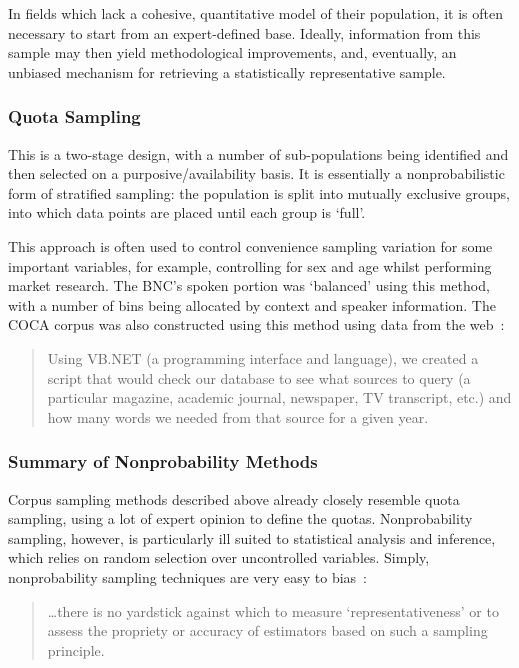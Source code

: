 In fields which lack a cohesive, quantitative model of their population, it is often necessary to start from an expert-defined base.  Ideally, information from this sample may then yield methodological improvements, and, eventually, an unbiased mechanism for retrieving a statistically representative sample.


\subsubsection{Quota Sampling}
This is a two-stage design, with a number of sub-populations being identified and then selected on a purposive/availability basis.  It is essentially a nonprobabilistic form of stratified sampling: the population is split into mutually exclusive groups, into which data points are placed until each group is `full'.

This approach is often used to control convenience sampling variation for some important variables, for example, controlling for sex and age whilst performing market research.  The BNC's spoken portion was `balanced' using this method, with a number of bins being allocated by context and speaker information.  The COCA corpus was also constructed using this method using data from the web~\cite[p. 163]{Davies20090601T0000001384-6655159}:

\begin{quote}
Using VB.NET (a programming interface and language), we created a script that would check our database to see what sources to query (a particular magazine, academic journal, newspaper, TV transcript, etc.) and how many words we needed from that source for a given year.
\end{quote}



\subsubsection{Summary of Nonprobability Methods}
Corpus sampling methods described above already closely resemble quota sampling, using a lot of expert opinion to define the quotas.  Nonprobability sampling, however, is particularly ill suited to statistical analysis and inference, which relies on random selection over uncontrolled variables.  Simply, nonprobability sampling techniques are very easy to bias~\cite[p.19]{barnett1991sample}:

\begin{quote}
\ldots{}there is no yardstick against which to measure `representativeness' or to assess the propriety or accuracy of estimators based on such a sampling principle.
\end{quote}

